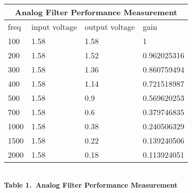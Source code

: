 \begin{center}
\begin{tabular}{|l|l|l|l|}
\hline
\multicolumn{4}{|c|}{Analog Filter Performance Measurement} \\
\hline
freq & input voltage & output voltage & gain \\
\hline
100 & 1.58 & 1.58 & 1 \\
200 & 1.58 & 1.52 & 0.962025316 \\
300 & 1.58 & 1.36 & 0.860759494 \\
400 & 1.58 & 1.14 & 0.721518987 \\
500 & 1.58 & 0.9 & 0.569620253 \\
700 & 1.58 & 0.6 & 0.379746835 \\
1000 & 1.58 & 0.38 & 0.240506329 \\
1500 & 1.58 & 0.22 & 0.139240506 \\
2000 & 1.58 & 0.18 & 0.113924051 \\
\hline
\end{tabular}
\label{Analog}\\[5pt]
\textbf{Table 1.\ Analog Filter Performance Measurement}
\end{center}